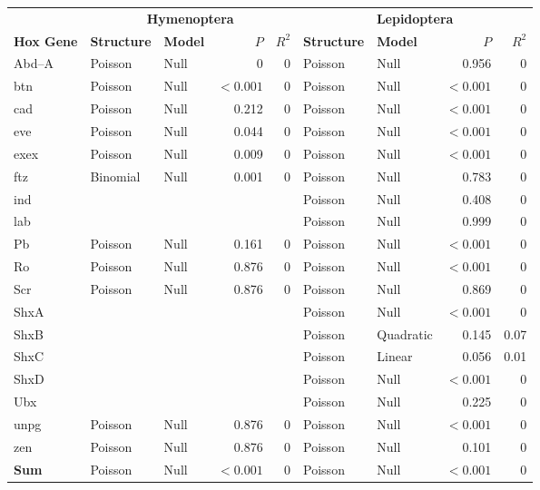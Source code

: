 \documentclass[11pt]{article}
\begin{document}
\begin{tabular}{lllrrllrr}
 & \multicolumn{4}{c}{\textbf{Hymenoptera}} & \multicolumn{4}{c}{\textbf{Lepidoptera}} \\
\cmidrule(lr){2-5} \cmidrule(lr){6-9}
\textbf{Hox Gene}  & \textbf{Structure} &  \textbf{Model} & \textbf{$P$} & \textbf{$R^2$} &\textbf{Structure} &  \textbf{Model} & \textbf{$P$} & \textbf{$R^2$} \\
\cmidrule(lr){1-9}
Abd--A & Poisson &Null &  0& 0 &  Poisson&Null &  0.956& 0 \\
btn & Poisson &Null & $<0.001$ & 0 &  Poisson&Null & $<0.001$ & 0\\
cad & Poisson &Null  & 	0.212 & 0 &  Poisson& Null	 & $<0.001$ & 	0\\
eve & Poisson &Null & 0.044 & 0 &   Poisson &Null	 & 	$<0.001$ & 0\\
exex & Poisson & Null & 0.009 & 0 &   Poisson & Null	 &  $<0.001$& 0\\
ftz & Binomial & Null & 0.001 & 0 & Poisson & 	Null	 &  0.783 & 	0\\
ind &&&&& Poisson &Null & 0.408 & 0\\
lab & &&&& Poisson & Null & 0.999 & 0 \\
Pb & Poisson & Null & 0.161 & 0 & Poisson & Null & $<0.001$ & 0 \\
Ro & Poisson & Null & 0.876 & 0 & Poisson & Null & $<0.001$ & 0 \\
Scr & Poisson & Null & 0.876 & 0 & Poisson & Null & 0.869 & 0 \\
ShxA &  &  &  &  & Poisson & Null & $<0.001$ & 0 \\
ShxB &  &  &  &  & Poisson & Quadratic & 0.145 & 0.07 \\
ShxC &  &  &  &  & Poisson & Linear & 0.056 & 0.01 \\
ShxD &  &  &  &  & Poisson & Null & $<0.001$ & 0 \\
Ubx & &&&& Poisson & Null & 0.225 & 0 \\
unpg & Poisson & Null & 0.876 & 0 & Poisson & Null & $<0.001$ & 0 \\
zen & Poisson & Null & 0.876 & 0 & Poisson & Null & 0.101 & 0 \\
\cmidrule(lr){2-5} \cmidrule(lr){6-9}
\textbf{Sum} & Poisson & Null & $<0.001$ & 0 & 	Poisson	 & Null	 &$<0.001$& 	0\\
\cmidrule(lr){1-9}
\end{tabular}
\doublespacing
\end{document}
